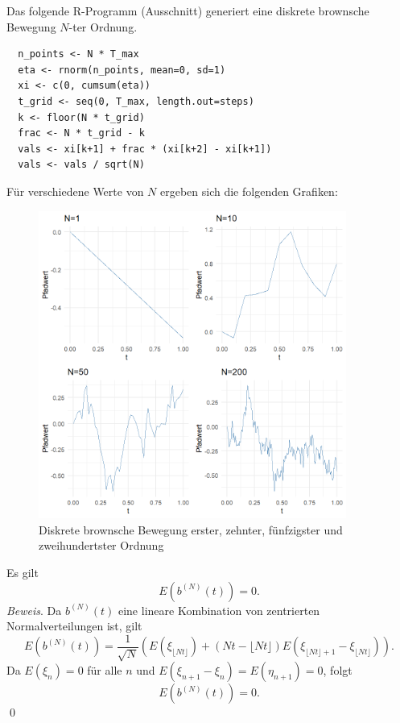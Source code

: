 \begin{bsp}
Das folgende R-Programm (Ausschnitt) generiert eine diskrete brownsche Bewegung $N$-ter Ordnung.

\begin{lstlisting}
  n_points <- N * T_max
  eta <- rnorm(n_points, mean=0, sd=1)
  xi <- c(0, cumsum(eta))
  t_grid <- seq(0, T_max, length.out=steps)
  k <- floor(N * t_grid)
  frac <- N * t_grid - k
  vals <- xi[k+1] + frac * (xi[k+2] - xi[k+1])
  vals <- vals / sqrt(N)
\end{lstlisting}
Für verschiedene Werte von $N$ ergeben sich die folgenden Grafiken:

\begin{figure}[H]
    \centering
    \includegraphics[width=0.9\textwidth]{images/disrete_bb.png}
    \caption{Diskrete brownsche Bewegung erster, zehnter, fünfzigster und zweihundertster Ordnung}
    \label{fig:brownian}
\end{figure}

\end{bsp}

\begin{lemma}
Es gilt
$$
E(b^{(N)}(t)) = 0.
$$
\textit{Beweis}.
Da $b^{(N)}(t)$ eine lineare Kombination von zentrierten Normalverteilungen ist, gilt
$$
E(b^{(N)}(t)) = \frac{1}{\sqrt{N}} \left( E(\xi_{\lfloor Nt \rfloor}) + (Nt - \lfloor Nt \rfloor) E(\xi_{\lfloor Nt \rfloor + 1} - \xi_{\lfloor Nt \rfloor}) \right).
$$
Da $E(\xi_n) = 0$ für alle $n$ und $E(\xi_{n+1} - \xi_n) = E(\eta_{n+1}) = 0$, folgt
$$
E(b^{(N)}(t)) = 0.
$$
\qed
\end{lemma}

